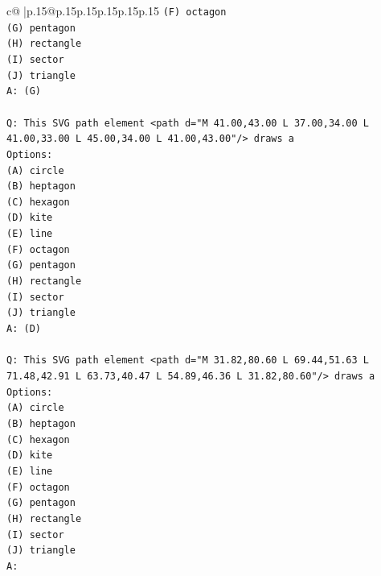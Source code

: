 \documentclass{article}
\begin{document}
{\begin{supertabular}{c@{$\;$}|p{.15\linewidth}@{}p{.15\linewidth}p{.15\linewidth}p{.15\linewidth}p{.15\linewidth}p{.15\linewidth}}
{{{\texttt{(F) octagon} \\
\texttt{(G) pentagon} \\
\texttt{(H) rectangle} \\
\texttt{(I) sector} \\
\texttt{(J) triangle} \\
\texttt{A: (G)} \\
\\ 
\texttt{Q: This SVG path element <path d="M 41.00,43.00 L 37.00,34.00 L 41.00,33.00 L 45.00,34.00 L 41.00,43.00"/> draws a} \\
\texttt{Options:} \\
\texttt{(A) circle} \\
\texttt{(B) heptagon} \\
\texttt{(C) hexagon} \\
\texttt{(D) kite} \\
\texttt{(E) line} \\
\texttt{(F) octagon} \\
\texttt{(G) pentagon} \\
\texttt{(H) rectangle} \\
\texttt{(I) sector} \\
\texttt{(J) triangle} \\
\texttt{A: (D)} \\
\\ 
\texttt{Q: This SVG path element <path d="M 31.82,80.60 L 69.44,51.63 L 71.48,42.91 L 63.73,40.47 L 54.89,46.36 L 31.82,80.60"/> draws a} \\
\texttt{Options:} \\
\texttt{(A) circle} \\
\texttt{(B) heptagon} \\
\texttt{(C) hexagon} \\
\texttt{(D) kite} \\
\texttt{(E) line} \\
\texttt{(F) octagon} \\
\texttt{(G) pentagon} \\
\texttt{(H) rectangle} \\
\texttt{(I) sector} \\
\texttt{(J) triangle} \\
\texttt{A:} \\
            }
        }
    }
     \\ \\


\end{supertabular}}
\end{document}
